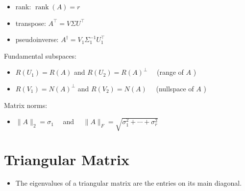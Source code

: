 \documentclass[13pt]{article}
\theoremstyle{definition}
\theoremstyle{remark}
\begin{document}
\begin{multicols}{2}
\begin{itemize}
  \item rank: $
  \operatorname{rank}(A)=r$

  \item transpose: $A^{\top}=V \Sigma U^{\top}$

  \item pseudoinverse: $A^{\dagger}=V_{1} \Sigma_{1}^{-1} U_{1}^{\top}$

\end{itemize}

Fundamental subspaces:

\begin{itemize}
  \item $R\left(U_{1}\right)=R(A)$ and $R\left(U_{2}\right)=R(A)^{\perp} \quad$ (range of $A$ )

  \item $R\left(V_{1}\right)=N(A)^{\perp}$ and $R\left(V_{2}\right)=N(A) \quad$ (nullspace of $A$ )

\end{itemize}

Matrix norms:

\begin{itemize}
  \item $\|A\|_{2}=\sigma_{1} \quad$ and $\quad\|A\|_{F}=\sqrt{\sigma_{1}^{2}+\cdots+\sigma_{r}^{2}}$
\end{itemize}
\end{multicols}

\headrule

\section{Triangular Matrix}
\begin{itemize}
    \item The eigenvalues of a triangular matrix are the entries on its main diagonal.
\end{itemize}

\headrule

\end{document}
